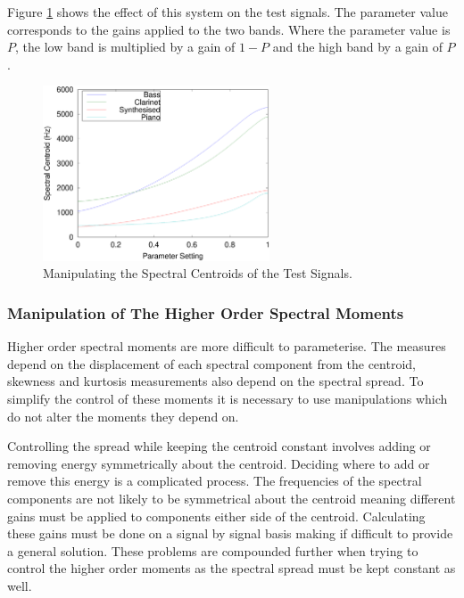 			Figure \ref{fig:MoveCentroids} shows the effect of this system on the test signals. The parameter
			value corresponds to the gains applied to the two bands. Where the parameter value is $P$, the low
			band is multiplied by a gain of $1 - P$ and the high band by a gain of $P$.

			\begin{figure}[h!]
				\centering
				\includegraphics[width=0.6\textwidth]{chapter6/Images/MoveCentroids.eps}
				\caption{Manipulating the Spectral Centroids of the Test Signals.}
				\label{fig:MoveCentroids}
			\end{figure}


		\subsubsection*{Manipulation of The Higher Order Spectral Moments}
			Higher order spectral moments are more difficult to parameterise. The measures depend on the
			displacement of each spectral component from the centroid, skewness and kurtosis measurements also
			depend on the spectral spread. To simplify the control of these moments it is necessary to use
			manipulations which do not alter the moments they depend on. 
			
			Controlling the spread while keeping the centroid constant involves adding or removing energy
			symmetrically about the centroid. Deciding where to add or remove this energy is a complicated
			process. The frequencies of the spectral components are not likely to be symmetrical about the
			centroid meaning different gains must be applied to components either side of the centroid.
			Calculating these gains must be done on a signal by signal basis making if difficult to provide a
			general solution. These problems are compounded further when trying to control the higher order
			moments as the spectral spread must be kept constant as well.

